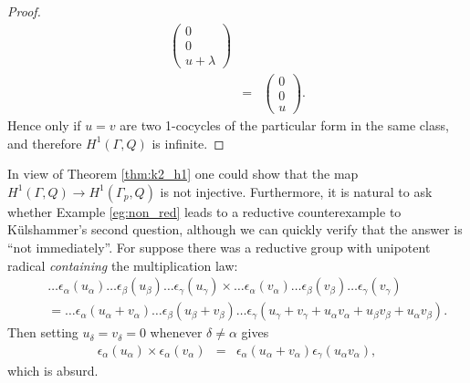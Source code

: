 \begin{proof}
\begin{eqnarray*}
		\left(\begin{matrix} 0 \\ 0 \\ u + \lambda\end{matrix}\right) \\
		&=&
		\left(\begin{matrix} 0 \\ 0 \\ u\end{matrix}\right).
	\end{eqnarray*}
	Hence only if $u=v$ are two 1-cocycles of the particular form in the same class, and therefore $H^1(\Gamma, Q)$ is infinite.
\end{proof}

In view of Theorem \ref{thm:k2_h1} one could show that the map $H^1(\Gamma, Q) \rightarrow H^1(\Gamma_p, Q)$ is not injective. Furthermore, it is natural to ask whether Example \ref{eg:non_red} leads to a reductive counterexample to K\"ulshammer's second question, although we can quickly verify that the answer is ``not immediately''. For suppose there was a reductive group with unipotent radical \emph{containing} the multiplication law:
\begin{eqnarray*}
	&&\ldots \epsilon_\alpha(u_\alpha) \ldots \epsilon_\beta(u_\beta) \ldots \epsilon_\gamma(u_\gamma) \times
	\ldots \epsilon_\alpha(v_\alpha) \ldots \epsilon_\beta(v_\beta) \ldots \epsilon_\gamma(v_\gamma)\\
	&&=
	\ldots \epsilon_\alpha(u_\alpha + v_\alpha) \ldots \epsilon_\beta(u_\beta + v_\beta) \ldots \epsilon_\gamma(u_\gamma + v_\gamma + u_\alpha v_\alpha + u_\beta v_\beta + u_\alpha v_\beta).
\end{eqnarray*}
Then setting $u_\delta = v_\delta = 0$ whenever $\delta \neq \alpha$ gives
\begin{eqnarray*}
	\epsilon_\alpha(u_\alpha) \times \epsilon_\alpha(v_\alpha) &=& \epsilon_\alpha(u_\alpha + v_\alpha) \epsilon_\gamma(u_\alpha v_\alpha),
\end{eqnarray*}
which is absurd.


